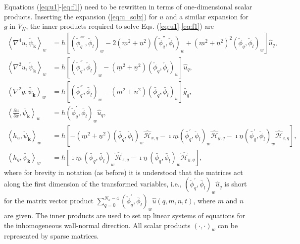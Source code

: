 \documentclass[preprint]{elsarticle}
\newcommand{\N}[1]{\check{#1}}
\newcommand{\D}[1]{\bar{#1}}
\begin{document}
Equations (\ref{eq:u1}-\ref{eq:f1}) need to be rewritten in terms of one-dimensional scalar products. 
Inserting the expansion (\ref{eq:u_solx}) for $u$ and a similar expansion for $g$ in $\D{V}_N$, the inner products required to solve Eqs. (\ref{eq:u1}-\ref{eq:f1}) are
\begin{align}
\left<\nabla^4u, \N{\psi}_{\bm{k}}\right>_w &= h\left[ \left( 
\N{\phi}_q^{''''}, 
\N{\phi}_l\right)_w -2(\underline{m}^2+\underline{n}^2) \left( \N{\phi}_q^{''}, 
\N{\phi}_l\right)_w + (\underline{m}^2+\underline{n}^2)^2\left( \N{\phi}_q, 
\N{\phi}_l\right)_w  \right] \hat{u}_q, \\
\left< \nabla^2 u, \N{\psi}_{\bm{k}}\right>_w &= h\left[\left( \N{\phi}_q^{''}, 
\N{\phi}_l\right)_w - (\underline{m}^2+\underline{n}^2)\left( \N{\phi}_q, 
\N{\phi}_l \right)_w \right] \hat{u}_q, \\
\left< \nabla^2 g, \D{\psi}_{\bm{k}}\right>_w &= h\left[\left( \D{\phi}_q^{''}, 
\D{\phi}_l\right)_w - (\underline{m}^2+\underline{n}^2)\left( \D{\phi}_q, 
\D{\phi}_l \right)_w \right] \hat{g}_q, \\
\left<\frac{\partial u}{\partial x}, \D{\psi}_{\bm{k}}\right>_w &=
h\left(\N{\phi}_q^{'}, \D{\phi}_l\right)_w \hat{u}_q, \\
\left<h_u, \N{\psi}_{\bm{k}} \right>_w &= 
h\left[-(\underline{m}^2+\underline{n}^2) 
\left(\D{\phi}_q, 
\N{\phi}_l \right)_w \hat{\mathcal{H}}_{x, q} - \imath \underline{m}\left(\D{\phi}_q^{'}, 
\N{\phi}_l \right)_w \hat{\mathcal{H}}_{y, q} - \imath 
\underline{n}\left(\D{\phi}_q^{'}, \N{\phi}_l \right)_w 
\hat{\mathcal{H}}_{z, q}\right], \label{eq:S_hv}
\\
\left< h_g, \D{\psi}_{\bm{k}} \right>_w &= h\left[ \imath \underline{m}\, \left(\D{\phi}_q, \D{\phi}_l \right)_w 
\hat{\mathcal{H}}_{z, q} - \imath \underline{n}\, \left(\D{\phi}_q, \D{\phi}_l \right)_w \hat{\mathcal{H}}_{y, q} 
\right],\label{eq:S_hg}
\end{align}
where for brevity in notation (as before) it is understood that the matrices 
act along the first dimension of the transformed variables, i.e.,  $ 
(\N{\phi}_q^{'}, \D{\phi}_l)_w \hat{u}_q$ is short for the matrix 
vector product $ \sum_{q=0}^{N_x-4}( \N{\phi}_q^{'}, \D{\phi}_l)_w 
\hat{u}(q, {m}, {n}, t)$, where $m$ and $n$ are given. The inner products are used to set up linear systems 
of equations for the inhomogeneous wall-normal direction. All scalar products 
$(\cdot, \cdot)_w$ can be represented by sparse matrices.
\end{document}

